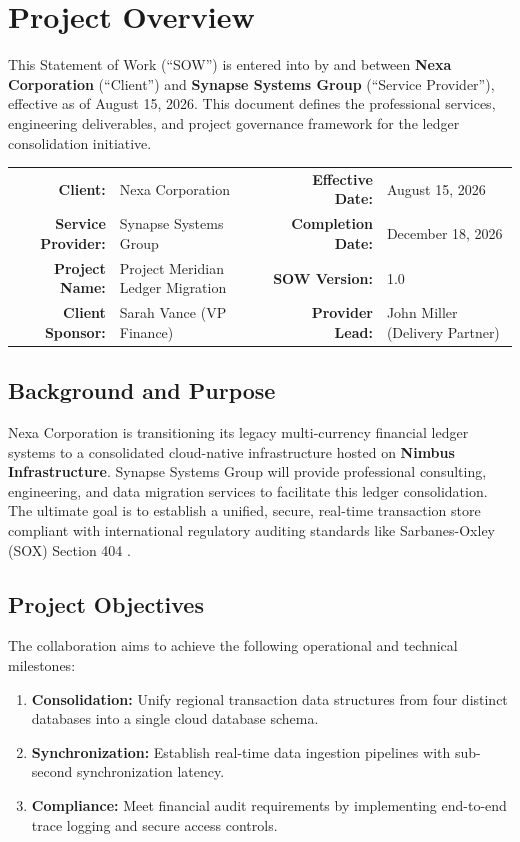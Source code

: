 \section{Project Overview}
This Statement of Work (``SOW'') is entered into by and between \textbf{Nexa Corporation} (``Client'') and \textbf{Synapse Systems Group} (``Service Provider''), effective as of August 15, 2026. This document defines the professional services, engineering deliverables, and project governance framework for the ledger consolidation initiative.

\vspace{0.4cm}
\noindent
\begin{tabularx}{\textwidth}{r X r X}
  \toprule
  \rowcolor{lightbg}\multicolumn{4}{l}{\bfseries\textcolor{primary}{\faFile \hspace{0.2cm} Document Metadata}} \\
  \midrule
  \textbf{Client:} & Nexa Corporation & \textbf{Effective Date:} & August 15, 2026 \\
  \textbf{Service Provider:} & Synapse Systems Group & \textbf{Completion Date:} & December 18, 2026 \\
  \textbf{Project Name:} & Project Meridian Ledger Migration & \textbf{SOW Version:} & 1.0 \\
  \textbf{Client Sponsor:} & Sarah Vance (VP Finance) & \textbf{Provider Lead:} & John Miller (Delivery Partner) \\
  \bottomrule
\end{tabularx}
\vspace{0.4cm}

\subsection{Background and Purpose}
Nexa Corporation is transitioning its legacy multi-currency financial ledger systems to a consolidated cloud-native infrastructure hosted on \textbf{Nimbus Infrastructure}. Synapse Systems Group will provide professional consulting, engineering, and data migration services to facilitate this ledger consolidation. The ultimate goal is to establish a unified, secure, real-time transaction store compliant with international regulatory auditing standards like Sarbanes-Oxley (SOX) Section 404 \cite{soxcompliance}.

\subsection{Project Objectives}
The collaboration aims to achieve the following operational and technical milestones:
\begin{enumerate}
  \item \textbf{Consolidation:} Unify regional transaction data structures from four distinct databases into a single cloud database schema.
  \item \textbf{Synchronization:} Establish real-time data ingestion pipelines with sub-second synchronization latency.
  \item \textbf{Compliance:} Meet financial audit requirements by implementing end-to-end trace logging and secure access controls.
\end{enumerate}

